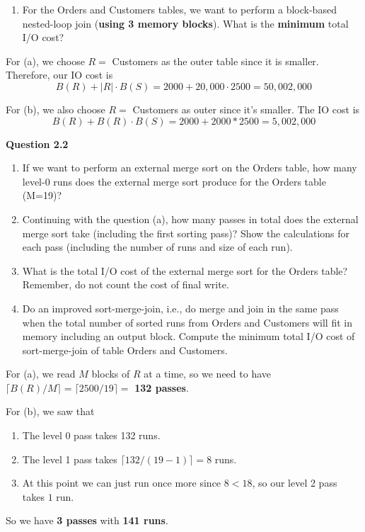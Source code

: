 \documentclass{article}
\begin{document}
\begin{example}
\begin{enumerate}[label=(\alph*)]
        \item For the Orders and Customers tables, we want to perform a block-based nested-loop join (\textbf{using 3 memory blocks}). What is the \textbf{minimum} total I/O cost?
      \end{enumerate}

      For (a), we choose $R = $ Customers as the outer table since it is smaller. Therefore, our IO cost is 
      \begin{equation}
        B(R) + |R| \cdot B(S)  = 2000 + 20,000 \cdot 2500 = 50,002,000
      \end{equation}

      For (b), we also choose $R = $ Customers as outer since it's smaller. The IO cost is 
      \begin{equation}
        B(R) + B(R) \cdot B(S)= 2000 + 2000 * 2500 = 5,002,000
      \end{equation}

      \vspace{1em}
      \noindent\textbf{Question 2.2}
      \begin{enumerate}[label=(\alph*)]
        \item If we want to perform an external merge sort on the Orders table, how many level-0 runs does the external merge sort produce for the Orders table (M=19)?
        
        \item Continuing with the question (a), how many passes in total does the external merge sort take (including the first sorting pass)? Show the calculations for each pass (including the number of runs and size of each run).
        
        \item What is the total I/O cost of the external merge sort for the Orders table? Remember, do not count the cost of final write.
        
        \item Do an improved sort-merge-join, i.e., do merge and join in the same pass when the total number of sorted runs from Orders and Customers will fit in memory including an output block. Compute the minimum total I/O cost of sort-merge-join of table Orders and Customers.
      \end{enumerate}

      For (a), we read $M$ blocks of $R$ at a time, so we need to have $\lceil B(R) / M \rceil = \lceil 2500 / 19 \rceil =$ \textbf{132 passes}. 

      For (b), we saw that 
      \begin{enumerate}
        \item The level 0 pass takes 132 runs. 
        \item The level 1 pass takes $\lceil 132 / (19 - 1) \rceil = 8$ runs. 
        \item At this point we can just run once more since $8 < 18$, so our level 2 pass takes $1$ run. 
      \end{enumerate}
      So we have \textbf{3 passes} with \textbf{141 runs}. 


\end{example}
\end{document}
